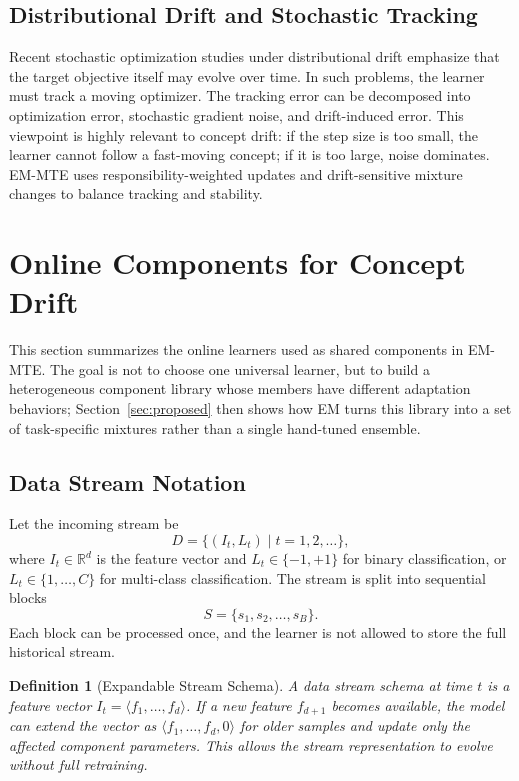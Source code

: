 ﻿\documentclass[12pt,a4paper]{article}
\newtheorem{definition}{Definition}
\newcommand{\R}{\mathbb{R}}
\begin{document}
\subsection{Distributional Drift and Stochastic Tracking}
Recent stochastic optimization studies under distributional drift emphasize that the target objective itself may evolve over time. In such problems, the learner must track a moving optimizer. The tracking error can be decomposed into optimization error, stochastic gradient noise, and drift-induced error. This viewpoint is highly relevant to concept drift: if the step size is too small, the learner cannot follow a fast-moving concept; if it is too large, noise dominates. EM-MTE uses responsibility-weighted updates and drift-sensitive mixture changes to balance tracking and stability.

\section{Online Components for Concept Drift}
\label{sec:background}
This section summarizes the online learners used as shared components in
EM-MTE. The goal is not to choose one universal learner, but to build a
heterogeneous component library whose members have different adaptation
behaviors; Section~\ref{sec:proposed} then shows how EM turns this library
into a set of task-specific mixtures rather than a single hand-tuned
ensemble.

\subsection{Data Stream Notation}
Let the incoming stream be
\begin{equation}
D = \{(I_t,L_t)\mid t=1,2,\ldots\},
\end{equation}
where $I_t\in\R^d$ is the feature vector and $L_t\in\{-1,+1\}$ for binary
classification, or $L_t\in\{1,\ldots,C\}$ for multi-class classification.
The stream is split into sequential blocks
\begin{equation}
S = \{s_1,s_2,\ldots,s_B\}.
\end{equation}
Each block can be processed once, and the learner is not allowed to store the
full historical stream.

\begin{definition}[Expandable Stream Schema]
A data stream schema at time $t$ is a feature vector
$I_t=\langle f_1,\ldots,f_d\rangle$. If a new feature $f_{d+1}$ becomes
available, the model can extend the vector as
$\langle f_1,\ldots,f_d,0\rangle$ for older samples and update only the
affected component parameters. This allows the stream representation to
evolve without full retraining.
\end{definition}
\end{document}
